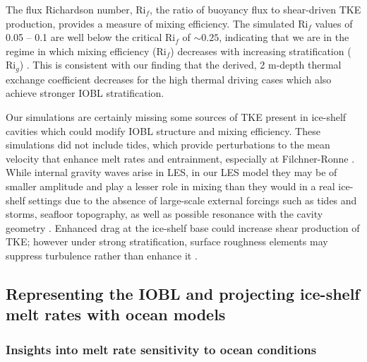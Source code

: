 \documentclass[draft]{styles/agujournal2019}
\begin{document}
The flux Richardson number, $\text{Ri}_f$, the ratio of buoyancy flux to shear-driven TKE production, provides a measure of mixing efficiency. The simulated $\text{Ri}_f$ values of 0.05 -- 0.1 are well below the critical $\text{Ri}_f$ of $\sim\!0.25$, indicating that we are in the regime in which mixing efficiency ($\text{Ri}_f$) decreases with increasing stratification ($\text{Ri}_g$) \cite{armenio_investigation_2002, peltier_mixing_2003}. This is consistent with our finding that the derived, 2 m-depth thermal exchange coefficient decreases for the high thermal driving cases which also achieve stronger IOBL stratification.

Our simulations are certainly missing some sources of TKE present in ice-shelf cavities which could modify IOBL structure and mixing efficiency. These simulations did not include tides, which provide perturbations to the mean velocity that enhance melt rates and entrainment, especially at Filchner-Ronne \cite{makinson_modeling_1999, makinson_influence_2011, mueller_tidal_2018}. While internal gravity waves arise in LES, in our LES model they may be of smaller amplitude and play a lesser role in mixing than they would in a real ice-shelf settings due to the absence of large-scale external forcings such as tides and storms, seafloor topography, as well as possible resonance with the cavity geometry \cite{gwyther_cold_2020, robertson_tidally_2013, padman_ocean_2018, mueller_impact_2012}. Enhanced drag at the ice-shelf base could increase shear production of TKE; however under strong stratification, surface roughness elements may suppress turbulence rather than enhance it \cite{ohya_wind-tunnel_2001}. 

\subsection{Representing the IOBL and projecting ice-shelf melt rates with ocean models}\label{disc:prm}

\subsubsection{Insights into melt rate sensitivity to ocean conditions}\label{disc:prm_sens}
\end{document}
